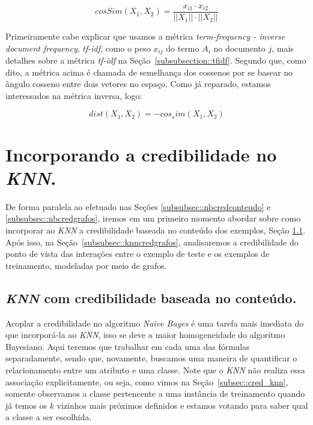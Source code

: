\begin{itemize}
\begin{equation}\label{eqn::distancia_texto}
    cosSim(X_1, X_2) = \frac{  x_{i1} \cdot x_{i2} }{ ||X_1|| \cdot ||X_2|| }
\end{equation}

Primeiramente cabe explicar que usamos a métrica \textit{term-frequency - inverse document frequency}, \textit{tf-idf}, como o peso $x_{ij}$ do termo $A_i$ no documento $j$, mais detalhes sobre a métrica \textit{tf-idf} na Seção~\ref{subsubsection::tfidf}. Segundo que, como dito, a métrica acima é chamada de semelhança dos cossenos por se basear no ângulo cosseno entre dois vetores no espaço. Como já reparado, estamos interessados na métrica inversa, logo:
 
 \begin{equation}\label{eqn::distancia_texto}
    dist(X_1, X_2) = - cos_sim(X_1, X_2)
\end{equation}


\end{itemize}

\section{Incorporando a credibilidade no \textit{KNN}.}
\label{subsubsec::knn_cred}

De forma paralela ao efetuado nas Seções \ref{subsubsec::nbcredconteudo} e \ref{subsubsec::nbcredgrafos}, iremos em um primeiro momento abordar sobre como incorporar ao \textit{KNN} a credibilidade baseada no conteúdo dos exemplos, Seção \ref{subsubsec::knncredconteudo}. Após isso, na Seção~\ref{subsubsec::knncredgrafos}, analisaremos a credibilidade do ponto de vista das interações entre o exemplo de teste e os exemplos de treinamento, modeladas por meio de grafos.

\subsection{\textit{KNN} com credibilidade baseada no conteúdo.}
\label{subsubsec::knncredconteudo}


Acoplar a credibilidade no algoritmo \textit{Naïve Bayes} é uma tarefa mais imediata do que incorporá-la ao \textit{KNN}, isso se deve a maior homogeneidade do algoritmo Bayesiano. Aqui teremos que trabalhar em cada uma das fórmulas separadamente, sendo que, novamente, buscamos uma maneira de quantificar o relacionamento entre um atributo e uma classe. Note que o \textit{KNN} não realiza essa associação explicitamente, ou seja, como vimos na Seção~\ref{subsec::cred_knn}, somente observamos a classe pertencente a uma instância de treinamento quando já temos os $k$ vizinhos mais próximos definidos e estamos votando para saber qual a classe a ser escolhida.


